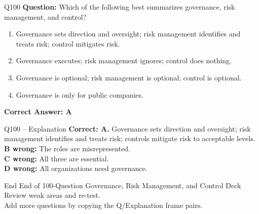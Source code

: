 \documentclass[aspectratio=169,10pt]{beamer}
\begin{document}
	\begin{frame}[t]{Q100}
		\small
		\textbf{Question:} Which of the following best summarizes governance, risk management, and control?
		\begin{enumerate}[label=\Alph*.,itemsep=1pt,topsep=2pt]
			\item Governance sets direction and oversight; risk management identifies and treats risk; control mitigates risk.
			\item Governance executes; risk management ignores; control does nothing.
			\item Governance is optional; risk management is optional; control is optional.
			\item Governance is only for public companies.
		\end{enumerate}
		\vspace{4pt}
		\textbf{Correct Answer: A}
	\end{frame}
	
	\begin{frame}[t]{Q100 -- Explanation}
		\small
		\textbf{Correct: A.} Governance sets direction and oversight; risk management identifies and treats risk; controls mitigate risk to acceptable levels. \\[4pt]
		\textbf{B wrong:} The roles are misrepresented. \\[2pt]
		\textbf{C wrong:} All three are essential. \\[2pt]
		\textbf{D wrong:} All organizations need governance.
	\end{frame}
	
	\begin{frame}{End}
		\centering
		\Large End of 100-Question Governance, Risk Management, and Control Deck\\[8pt]
		\normalsize Review weak areas and re-test.\\[4pt]
		\small Add more questions by copying the Q/Explanation frame pairs.
	\end{frame}
	
\end{document}
